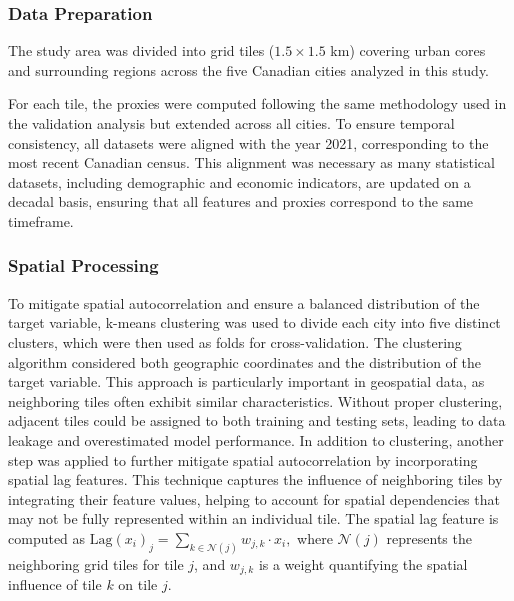 \documentclass[conference]{IEEEtran}
\begin{document}
\subsubsection{Data Preparation}
The study area was divided into grid tiles (\(1.5 \times 1.5\) km) covering urban cores and surrounding regions across the five Canadian cities analyzed in this study.

For each tile, the proxies were computed following the same methodology used in the validation analysis but extended across all cities. To ensure temporal consistency, all datasets were aligned with the year 2021, corresponding to the most recent Canadian census. This alignment was necessary as many statistical datasets, including demographic and economic indicators, are updated on a decadal basis, ensuring that all features and proxies correspond to the same timeframe.


\subsubsection{Spatial Processing}
To mitigate spatial autocorrelation and ensure a balanced distribution of the target variable, k-means clustering was used to divide each city into five distinct clusters, which were then used as folds for cross-validation. The clustering algorithm considered both geographic coordinates and the distribution of the target variable. This approach is particularly important in geospatial data, as neighboring tiles often exhibit similar characteristics. Without proper clustering, adjacent tiles could be assigned to both training and testing sets, leading to data leakage and overestimated model performance. In addition to clustering, another step was applied to further mitigate spatial autocorrelation by incorporating spatial lag features. This technique captures the influence of neighboring tiles by integrating their feature values, helping to account for spatial dependencies that may not be fully represented within an individual tile. The spatial lag feature is computed as $\text{Lag}(x_i)_j = \sum_{k \in \mathcal{N}(j)} w_{j,k} \cdot x_i,$ 
where \(\mathcal{N}(j)\) represents the neighboring grid tiles for tile \(j\), and \(w_{j,k}\) is a weight quantifying the spatial influence of tile \(k\) on tile \(j\).
\end{document}
